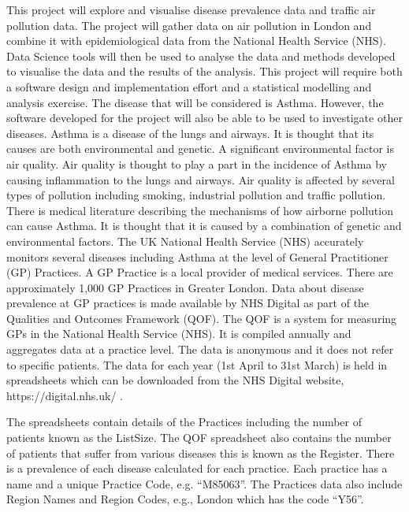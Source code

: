 This project will explore and visualise disease prevalence data and traffic air pollution data. The project will gather data on air pollution in London and combine it with epidemiological data from the National Health Service (NHS). Data Science tools will then be used to analyse the data and methods developed to visualise the data and the results of the analysis. This project will require both a software design and implementation effort and a statistical modelling and analysis exercise.
The disease that will be considered is Asthma. However, the software developed for the project will also be able to be used to investigate other diseases. Asthma is a disease of the lungs and airways. It is thought that its causes are both environmental and genetic. A significant environmental factor is air quality. Air quality is thought to play a part in the incidence of Asthma by causing inflammation to the lungs and airways. Air quality is affected by several types of pollution including smoking, industrial pollution and traffic pollution. There is medical literature describing the mechanisms of how airborne pollution can cause Asthma. It is thought that it is caused by a combination of genetic and environmental factors. 
The UK National Health Service (NHS) accurately monitors several diseases including Asthma at the level of General Practitioner (GP) Practices. A GP Practice is a local provider of medical services. There are approximately 1,000 GP Practices in Greater London. Data about disease prevalence at GP practices is made available by NHS Digital as part of the Qualities and Outcomes Framework (QOF). The QOF is a system for measuring GPs in the National Health Service (NHS). It is compiled annually and aggregates data at a practice level. The data is anonymous and it does not refer to specific patients. The data for each year (1st April to 31st March) is held in spreadsheets which can be downloaded from the NHS Digital website, https://digital.nhs.uk/ .

The spreadsheets contain details of the Practices including the number of patients known as the ListSize. The QOF spreadsheet also contains the number of patients that suffer from various diseases this is known as the Register. There is a prevalence of each disease calculated for each practice. Each practice has a name and a unique Practice Code, e.g. “M85063”. The Practices data also include Region Names and Region Codes, e.g., London which has the code “Y56”.

